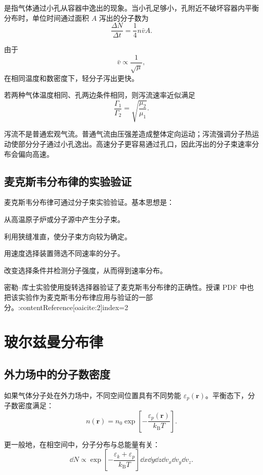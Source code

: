 是指气体通过小孔从容器中逸出的现象。当小孔足够小，孔附近不破坏容器内平衡分布时，单位时间通过面积 \(A\) 泻出的分子数为
\[
  \boxed{
  \frac{\Delta N}{\Delta t}
  =
  \frac14 n\bar v A
  }.
\]

由于
\[
  \bar v\propto \frac{1}{\sqrt{\mu}},
\]
在相同温度和数密度下，轻分子泻出更快。

若两种气体温度相同、孔两边条件相同，则泻流速率近似满足
\[
  \frac{\Gamma_1}{\Gamma_2}
  =
  \sqrt{\frac{\mu_2}{\mu_1}}.
\]

\begin{KeyBox}[泻流的物理图像]
泻流不是普通宏观气流。普通气流由压强差造成整体定向运动；泻流强调分子热运动使部分分子通过小孔逸出。高速分子更容易通过孔口，因此泻出的分子束速率分布会偏向高速。
\end{KeyBox}

\subsection{麦克斯韦分布律的实验验证}

麦克斯韦分布律可通过分子束实验验证。基本思想是：
\begin{ReviewList}
  \item 从高温原子炉或分子源中产生分子束。
  \item 利用狭缝准直，使分子束方向较为确定。
  \item 用速度选择装置筛选不同速率的分子。
  \item 改变选择条件并检测分子强度，从而得到速率分布。
\end{ReviewList}

密勒--库士实验使用旋转选择器验证了麦克斯韦分布律的正确性。授课 PDF 中也把该实验作为麦克斯韦分布律应用与验证的一部分。:contentReference[oaicite:2]{index=2}

\section{玻尔兹曼分布律}

\subsection{外力场中的分子数密度}

如果气体分子处在外力场中，不同空间位置具有不同势能 \(\varepsilon_p(\bm r)\)。平衡态下，分子数密度满足：
\[
  \boxed{
  n(\bm r)
  =
  n_0
  \exp\left[
  -\frac{\varepsilon_p(\bm r)}{k_{\mathrm B}T}
  \right]
  }.
\]

更一般地，在相空间中，分子分布与总能量有关：
\[
  \dd N
  \propto
  \exp\left[
  -\frac{\varepsilon_k+\varepsilon_p}{k_{\mathrm B}T}
  \right]
  \dd x\dd y\dd z\dd v_x\dd v_y\dd v_z.
\]

